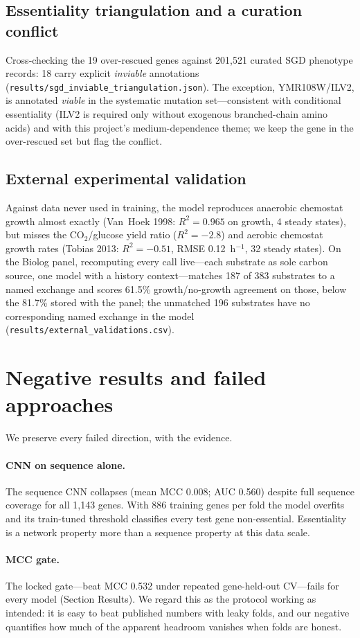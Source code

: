 \documentclass[12pt]{article}
\begin{document}
\subsection{Essentiality triangulation and a curation conflict}
Cross-checking the 19 over-rescued genes against 201{,}521 curated SGD
phenotype records: 18 carry explicit \emph{inviable} annotations
(\texttt{results/sgd\_inviable\_triangulation.json}). The exception,
YMR108W/ILV2, is annotated \emph{viable} in the systematic mutation
set---consistent with conditional essentiality (ILV2 is required only
without exogenous branched-chain amino acids) and with this project's
medium-dependence theme; we keep the gene in the over-rescued set but
flag the conflict.

\subsection{External experimental validation}
Against data never used in training, the model reproduces anaerobic
chemostat growth almost exactly (Van~Hoek 1998: $R^2=0.965$ on growth,
4 steady states), but misses the CO$_2$/glucose yield ratio
($R^2=-2.8$) and aerobic chemostat growth rates (Tobias 2013:
$R^2=-0.51$, RMSE 0.12~h$^{-1}$, 32 steady states). On the Biolog panel,
recomputing every call live---each substrate as sole carbon source, one
model with a history context---matches 187 of 383 substrates to a named
exchange and scores 61.5\% growth/no-growth agreement on those, below
the 81.7\% stored with the panel; the unmatched 196 substrates have no
corresponding named exchange in the model
(\texttt{results/external\_validations.csv}).

\section{Negative results and failed approaches}
\label{sec:negatives}
We preserve every failed direction, with the evidence.
\paragraph{CNN on sequence alone.} The sequence CNN collapses (mean MCC
0.008; AUC 0.560) despite full sequence coverage for all 1{,}143 genes.
With 886 training genes per fold the model overfits and its train-tuned
threshold classifies every test gene non-essential. Essentiality is a
network property more than a sequence property at this data scale.
\paragraph{MCC gate.} The locked gate---beat MCC 0.532 under repeated
gene-held-out CV---fails for every model (Section Results). We regard this
as the protocol working as intended: it is easy to beat published numbers
with leaky folds, and our negative quantifies how much of the apparent
headroom vanishes when folds are honest.
\end{document}
